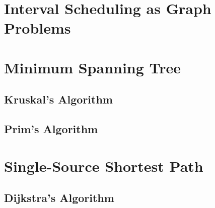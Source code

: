 \section{Interval Scheduling as Graph Problems}

\section{Minimum Spanning Tree}

\subsection{Kruskal's Algorithm}

\subsection{Prim's Algorithm}

\section{Single-Source Shortest Path}

\subsection{Dijkstra's Algorithm}